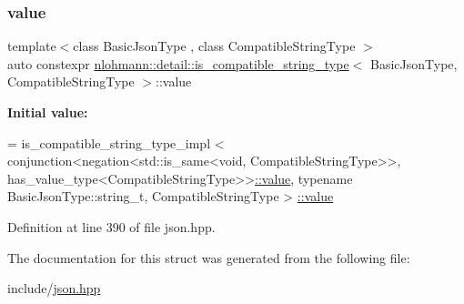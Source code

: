 \subsubsection{\texorpdfstring{value}{value}}
{\footnotesize\ttfamily template$<$class Basic\+Json\+Type , class Compatible\+String\+Type $>$ \\
auto constexpr \hyperlink{structnlohmann_1_1detail_1_1is__compatible__string__type}{nlohmann\+::detail\+::is\+\_\+compatible\+\_\+string\+\_\+type}$<$ Basic\+Json\+Type, Compatible\+String\+Type $>$\+::value\hspace{0.3cm}{\ttfamily [static]}}

{\bfseries Initial value\+:}
\begin{DoxyCode}
= is\_compatible\_string\_type\_impl <
                                  conjunction<negation<std::is\_same<void, CompatibleStringType>>,
                                  has\_value\_type<CompatibleStringType>>\hyperlink{structnlohmann_1_1detail_1_1is__compatible__string__type_a60b198ed4c09d969a223487f23d1570d}{::value},
                                  \textcolor{keyword}{typename} BasicJsonType::string\_t, CompatibleStringType >
      \hyperlink{structnlohmann_1_1detail_1_1is__compatible__string__type_a60b198ed4c09d969a223487f23d1570d}{::value}
\end{DoxyCode}


Definition at line 390 of file json.\+hpp.



The documentation for this struct was generated from the following file\+:\begin{DoxyCompactItemize}
\item 
include/\hyperlink{json_8hpp}{json.\+hpp}\end{DoxyCompactItemize}
